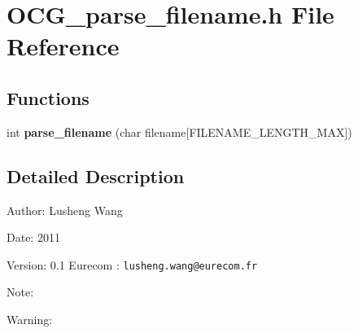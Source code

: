 \section{OCG\_\-parse\_\-filename.h File Reference}
\label{OCG__parse__filename_8h}
\subsection*{Functions}
\begin{CompactItemize}
\item 
int {\bf parse\_\-filename} (char filename[FILENAME\_\-LENGTH\_\-MAX])
\end{CompactItemize}


\subsection{Detailed Description}
\begin{Desc}
\item[Author:]Lusheng Wang \end{Desc}
\begin{Desc}
\item[Date:]2011 \end{Desc}
\begin{Desc}
\item[Version:]0.1  Eurecom : {\tt lusheng.wang@eurecom.fr} \end{Desc}
\begin{Desc}
\item[Note:]\end{Desc}
\begin{Desc}
\item[Warning:]\end{Desc}
